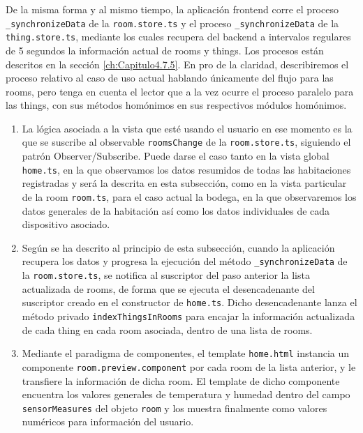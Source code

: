 \vspace{1cm}

De la misma forma y al mismo tiempo, la aplicación frontend corre el proceso \verb|_synchronizeData| de la \verb|room.store.ts| y el proceso \verb|_synchronizeData| de la \verb|thing.store.ts|, mediante los cuales recupera del backend a intervalos regulares de 5 segundos la información actual de rooms y things. Los procesos están descritos en la sección \ref{ch:Capitulo4.7.5}. En pro de la claridad, describiremos el proceso relativo al caso de uso actual hablando únicamente del flujo para las rooms, pero tenga en cuenta el lector que a la vez ocurre el proceso paralelo para las things, con sus métodos homónimos en sus respectivos módulos homónimos.

\begin{enumerate}
\item La lógica asociada a la vista que esté usando el usuario en ese momento es la que se suscribe al observable \verb|roomsChange| de la \verb|room.store.ts|, siguiendo el patrón Observer/Subscribe. Puede darse el caso tanto en la vista global \verb|home.ts|, en la que observamos los datos resumidos de todas las habitaciones registradas y será la descrita en esta subsección, como en la vista particular de la room \verb|room.ts|, para el caso actual la bodega, en la que observaremos los datos generales de la habitación así como los datos individuales de cada dispositivo asociado.
\item Según se ha descrito al principio de esta subsección, cuando la aplicación recupera los datos y progresa la ejecución del método \verb|_synchronizeData| de la \verb|room.store.ts|, se notifica al suscriptor del paso anterior la lista actualizada de rooms, de forma que se ejecuta el desencadenante del suscriptor creado en el constructor de \verb|home.ts|. Dicho desencadenante lanza el método privado \verb|indexThingsInRooms| para encajar la información actualizada de cada thing en cada room asociada, dentro de una lista de rooms.
\item Mediante el paradigma de componentes, el template \verb|home.html| instancia un componente \verb|room.preview.component| por cada room de la lista anterior, y le transfiere la información de dicha room. El template de dicho componente encuentra los valores generales de temperatura y humedad dentro del campo \verb|sensorMeasures| del objeto \verb|room| y los muestra finalmente como valores numéricos para información del usuario.
\end{enumerate}